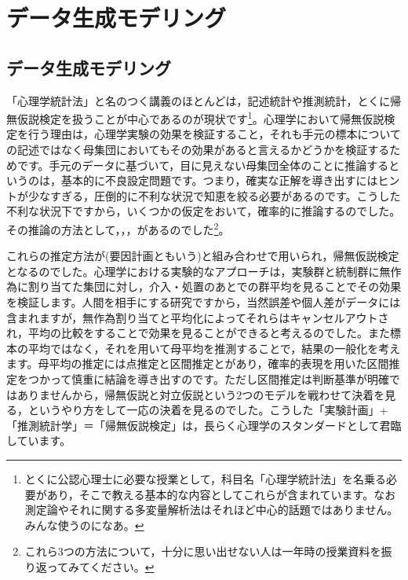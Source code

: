 \documentclass{ltjsbook}
\begin{document}
\chapter{データ生成モデリング}
\label{x17_Bayesian}

\section{データ生成モデリング}
「心理学統計法」と名のつく講義のほとんどは，記述統計や推測統計，とくに帰無仮説検定を扱うことが中心であるのが現状です\footnote{とくに公認心理士に必要な授業として，科目名「心理学統計法」を名乗る必要があり，そこで教える基本的な内容としてこれらが含まれています。なお測定論やそれに関する多変量解析法はそれほど中心的話題ではありません。みんな使うのになあ。}。心理学において帰無仮説検定を行う理由は，心理学実験の効果を検証すること，それも手元の標本についての記述ではなく母集団においてもその効果があると言えるかどうかを検証するためです。手元のデータに基づいて，目に見えない母集団全体のことに推論するというのは，基本的に不良設定問題です。つまり，確実な正解を導き出すにはヒントが少なすぎる，圧倒的に不利な状況で知恵を絞る必要があるのです。こうした不利な状況下ですから，いくつかの仮定をおいて，確率的に推論するのでした。その推論の方法として，，，があるのでした\footnote{これら3つの方法について，十分に思い出せない人は一年時の授業資料を振り返ってみてください。}。

これらの推定方法が(要因計画ともいう)と組み合わせで用いられ，帰無仮説検定となるのでした。心理学における実験的なアプローチは，実験群と統制群に無作為に割り当てた集団に対し，介入・処置のあとでの群平均を見ることでその効果を検証します。人間を相手にする研究ですから，当然誤差や個人差がデータには含まれますが，無作為割り当てと平均化によってそれらはキャンセルアウトされ，平均の比較をすることで効果を見ることができると考えるのでした。また標本の平均ではなく，それを用いて母平均を推測することで，結果の一般化を考えます。母平均の推定には点推定と区間推定とがあり，確率的表現を用いた区間推定をつかって慎重に結論を導き出すのです。ただし区間推定は判断基準が明確ではありませんから，帰無仮説と対立仮説という2つのモデルを戦わせて決着を見る，というやり方をして一応の決着を見るのでした。こうした「実験計画」+「推測統計学」＝「帰無仮説検定」は，長らく心理学のスタンダードとして君臨しています。
\end{document}
